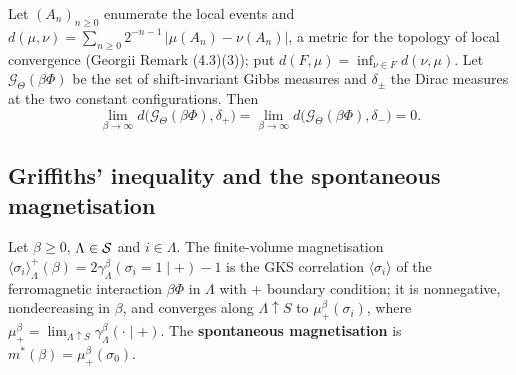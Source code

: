 \begin{theorem}
    \label{thm:ising-69-limit}
    \leanok

    Let $(A_n)_{n \geq 0}$ enumerate the local events and
    $d(\mu,\nu) = \sum_{n \geq 0} 2^{-n-1}\,|\mu(A_n) - \nu(A_n)|$, a metric for the topology of
    local convergence (Georgii Remark (4.3)(3)); put $d(F,\mu) = \inf_{\nu \in F} d(\nu,\mu)$. Let
    $\mathcal{G}_{\Theta}(\beta\Phi)$ be the set of shift-invariant Gibbs measures and
    $\delta_\pm$ the Dirac measures at the two constant configurations. Then
    \[\lim_{\beta \to \infty} d\bigl(\mathcal{G}_{\Theta}(\beta\Phi), \delta_+\bigr)
      = \lim_{\beta \to \infty} d\bigl(\mathcal{G}_{\Theta}(\beta\Phi), \delta_-\bigr) = 0.\]
\end{theorem}

\subsection*{Griffiths' inequality and the spontaneous magnetisation}

\begin{lemma}
    \label{lem:ising-gks-fvmag}
    \leanok

    Let $\beta \geq 0$, $\Lambda \in \mathcal{S}$ and $i \in \Lambda$. The finite-volume magnetisation
    $\langle\sigma_i\rangle_{\Lambda}^{+}(\beta) = 2\gamma^{\beta}_{\Lambda}(\sigma_i = 1 \mid +)-1$
    is the GKS correlation $\langle\sigma_i\rangle$ of the ferromagnetic interaction $\beta\Phi$ in
    $\Lambda$ with $+$ boundary condition; it is nonnegative, nondecreasing in $\beta$, and
    converges along $\Lambda \uparrow S$ to $\mu_+^{\beta}(\sigma_i)$, where
    $\mu_+^{\beta} = \lim_{\Lambda \uparrow S} \gamma^{\beta}_{\Lambda}(\cdot \mid +)$. The
    \textbf{spontaneous magnetisation} is $m^*(\beta) = \mu_+^{\beta}(\sigma_0)$.
\end{lemma}

